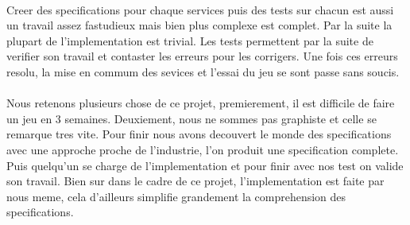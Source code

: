\documentclass[a4paper,titlepage,openany,12pt]{report}
\begin{document}
\paragraph{}
Creer des specifications pour chaque services puis des tests sur
chacun est aussi un travail assez fastudieux mais bien plus complexe
est complet. Par la suite la plupart de l'implementation est trivial.
Les tests permettent par la suite de verifier son travail et contaster
les erreurs pour les corrigers.
Une fois ces erreurs resolu, la mise en commum des sevices et l'essai
du jeu se sont passe sans soucis.

\paragraph{}
Nous retenons plusieurs chose de ce projet, premierement, il est
difficile de faire un jeu en 3 semaines.
Deuxiement, nous ne sommes pas graphiste et celle se remarque tres
vite.
Pour finir nous avons decouvert le monde des specifications avec une
approche proche de l'industrie, l'on produit une specification
complete. Puis quelqu'un se charge de l'implementation et pour finir
avec nos test on valide son travail.
Bien sur dans le cadre de ce projet, l'implementation est faite par
nous meme, cela d'ailleurs simplifie grandement la comprehension des
specifications.
\end{document}
